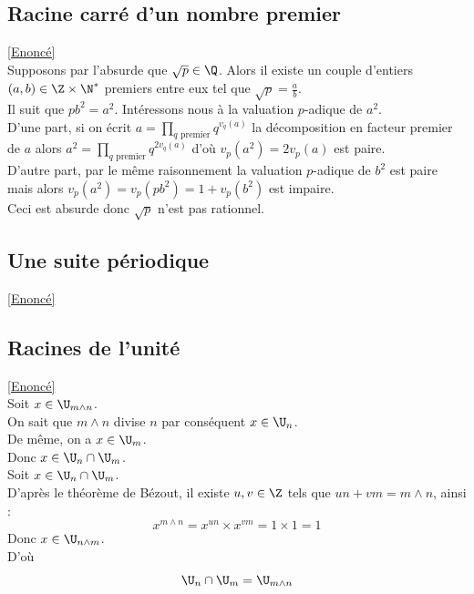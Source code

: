 \documentclass[8pt]{book}
\begin{document}
	\subsection{Racine carré d'un nombre premier }
	\label{Racine carré d'un nombre premier corrigé}
	\textcolor{blue}{\hyperref[Racine carré d'un nombre premier]{[Enoncé]}}\\
	Supposons par l'absurde que $\sqrt{p}\in \Q$. Alors il existe un couple d'entiers $(a,b)\in \Z\times \N^*$ premiers entre eux tel que $\sqrt{p}=\displaystyle\frac{a}{b}$.\\
	Il suit que $pb^2=a^2$. Intéressons nous à la valuation $p$-adique de $a^2$.\\
	D'une part, si on écrit $a=\displaystyle\prod_{q\text{ premier}}q^{v_q(a)}$ la décomposition en facteur premier de $a$ alors $a^2=\displaystyle\prod_{q\text{ premier}}q^{2v_q(a)}$ d'où $v_p(a^2)=2v_p(a)$ est paire.\\
	D'autre part, par le même raisonnement la valuation $p$-adique de $b^2$ est paire mais alors $v_p(a^2)=v_p(pb^2)=1+v_p(b^2)$ est impaire.\\
	Ceci est absurde donc $\sqrt{p}$ n'est pas rationnel.
	
	\subsection{Une suite périodique}
	\label{Une suite périodique corrigé}
	\textcolor{blue}{\hyperref[Une suite périodique]{[Enoncé]}}\\
	
	\subsection{Racines de l'unité}
	\label{Racines de l'unité corrigé}
	\textcolor{blue}{\hyperref[Racines de l'unité]{[Enoncé]}}\\
	Soit $x\in\U_{m\wedge n}$.\\
	On sait que $m\wedge n$ divise $n$ par conséquent $x\in\U_n$.\\
	De même, on a $x\in\U_m$.\\
	Donc $x\in\U_n\cap\U_m$.\\
	Soit $x\in\U_n\cap\U_m$.\\
	D'après le théorème de Bézout, il existe $u,v\in\Z$ tels que $un+vm=m\wedge n$, ainsi :
	\[x^{m\wedge n}=x^{un}\times x^{vm}=1\times 1=1\]
	Donc $x\in\U_{n\wedge m}$.\\
	D'où \[\U_n\cap\U_m=\U_{m\wedge n}\]
	
\end{document}
